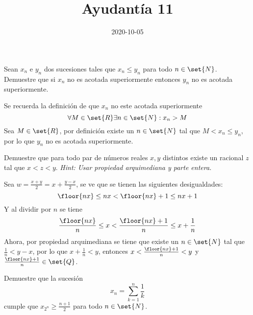 \documentclass{ayudantia}
\title{Ayudantía 11}
\date{2020-10-05}
\begin{document}
\maketitle

\begin{prob}
    Sean \(x_n\) e \(y_n\) dos sucesiones tales que \(x_n\leq y_n\) para todo \(n\in\set{N}\). Demuestre que si \(x_n\) no es acotada superiormente entonces \(y_n\) no es acotada superiormente.
\end{prob}

\begin{ans}
    \begin{sol}
        Se recuerda la definición de que \(x_n\) no este acotada superiormente
        \begin{equation*}
            \forall M\in\set{R}\exists n\in\set{N}:x_n>M
        \end{equation*}
        Sea \(M\in\set{R}\), por definición existe un \(n\in\set{N}\) tal que \(M<x_n\leq y_n\), por lo que \(y_n\) no es acotada superiormente.
    \end{sol}
\end{ans}


\begin{prob}
    Demuestre que para todo par de números reales \(x,y\) distintos existe un racional \(z\) tal que \(x<z<y\).
    \textit{Hint: Usar propiedad arquimediana y parte entera.}
\end{prob}

\begin{ans}
    \begin{sol}
        Sea \(w=\frac{x+y}2=x+\frac{y-x}2\), se ve que se tienen las siguientes desigualdades:
        \begin{equation*}
            \floor{nx}\leq nx<\floor{nx}+1\leq nx+1
        \end{equation*}
        Y al dividir por \(n\) se tiene
        \begin{equation*}
            \frac{\floor{nx}}{n}\leq x<\frac{\floor{nx}+1}{n}\leq x+\frac1{n}
        \end{equation*}
        Ahora, por propiedad arquimediana se tiene que existe un \(n\in\set{N}\) tal que \(\frac1n<y-x\), por lo que \(x+\frac1n<y\), entonces \(x<\frac{\floor{nx}+1}n<y\) y \(\frac{\floor{nx}+1}n\in\set{Q}\).
    \end{sol}
\end{ans}


\begin{prob}
    Demuestre que la sucesión
    \begin{equation*}
        x_n=\sum_{k=1}^n\frac1k
    \end{equation*}
    cumple que \(x_{2^n}\geq\frac{n+1}2\) para todo \(n\in\set{N}\).
\end{prob}
\end{document}
